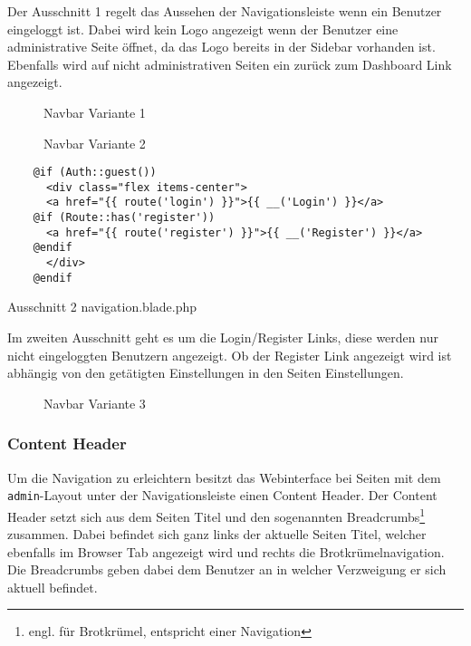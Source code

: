 Der Ausschnitt 1 regelt das Aussehen der Navigationsleiste wenn ein Benutzer
eingeloggt ist. Dabei wird kein Logo angezeigt wenn der Benutzer eine
administrative Seite öffnet, da das Logo bereits in der
Sidebar vorhanden ist. Ebenfalls wird auf nicht administrativen Seiten ein
zurück zum Dashboard Link angezeigt.

\begin{figure}[H]
  \centering
  \caption{Navbar Variante 1}
\end{figure}

\begin{figure}[H]
  \centering
  \caption{Navbar Variante 2}
\end{figure}

\begin{listing}[H]
  \begin{verbatim}
    @if (Auth::guest())
      <div class="flex items-center">
      <a href="{{ route('login') }}">{{ __('Login') }}</a>
    @if (Route::has('register'))
      <a href="{{ route('register') }}">{{ __('Register') }}</a>
    @endif
      </div>
    @endif
  \end{verbatim}
  \caption{Ausschnitt 2 navigation.blade.php}
\end{listing}

Im zweiten Ausschnitt geht es um die Login/Register Links, diese werden nur
nicht eingeloggten Benutzern angezeigt. Ob der Register Link angezeigt wird ist
abhängig von den getätigten Einstellungen in den Seiten Einstellungen.

\begin{figure}[H]
  \centering
  \caption{Navbar Variante 3}
\end{figure}

\subsubsection{Content Header}
Um die Navigation zu erleichtern besitzt das Webinterface bei Seiten mit dem
\verb|admin|-Layout unter der Navigationsleiste einen Content Header. Der
Content Header setzt sich aus dem Seiten Titel und den sogenannten Breadcrumbs\footnote{engl.
für Brotkrümel, entspricht einer Navigation} zusammen. Dabei befindet sich ganz
links der aktuelle Seiten Titel, welcher ebenfalls im Browser Tab angezeigt wird
und rechts die Brotkrümelnavigation. Die Breadcrumbs geben dabei dem Benutzer an
in welcher Verzweigung er sich aktuell befindet.\\

